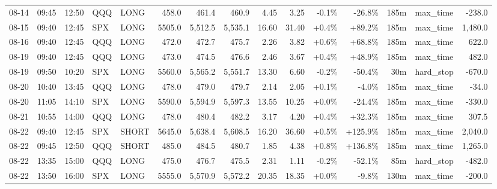 \documentclass[11pt,a4paper,twoside]{article}
\begin{document}
\begin{landscape}
\begin{center}
\begin{longtable}{>{\color{txtmain}}l l l l l r r r r r r r r >{\color{txtmain}}l r}
08-14 & 09:45 & 12:50 & QQQ & LONG & 458.0 & 461.4 & 460.9 & 4.45 & 3.25 & \textcolor{lossred}{-0.1\%} & \textcolor{lossred}{-26.8\%} & 185m & max\_time & \textcolor{lossred}{-238.0} \\
08-15 & 09:40 & 12:45 & SPX & LONG & 5505.0 & 5,512.5 & 5,535.1 & 16.60 & 31.40 & \textcolor{wingreen}{+0.4\%} & \textcolor{wingreen}{+89.2\%} & 185m & max\_time & \textcolor{wingreen}{1,480.0} \\
08-16 & 09:40 & 12:45 & QQQ & LONG & 472.0 & 472.7 & 475.7 & 2.26 & 3.82 & \textcolor{wingreen}{+0.6\%} & \textcolor{wingreen}{+68.8\%} & 185m & max\_time & \textcolor{wingreen}{622.0} \\
08-19 & 09:40 & 12:45 & QQQ & LONG & 473.0 & 474.5 & 476.6 & 2.46 & 3.67 & \textcolor{wingreen}{+0.4\%} & \textcolor{wingreen}{+48.9\%} & 185m & max\_time & \textcolor{wingreen}{482.0} \\
08-19 & 09:50 & 10:20 & SPX & LONG & 5560.0 & 5,565.2 & 5,551.7 & 13.30 & 6.60 & \textcolor{lossred}{-0.2\%} & \textcolor{lossred}{-50.4\%} & 30m & hard\_stop & \textcolor{lossred}{-670.0} \\
08-20 & 10:40 & 13:45 & QQQ & LONG & 478.0 & 479.0 & 479.7 & 2.14 & 2.05 & \textcolor{wingreen}{+0.1\%} & \textcolor{lossred}{-4.0\%} & 185m & max\_time & \textcolor{lossred}{-34.0} \\
08-20 & 11:05 & 14:10 & SPX & LONG & 5590.0 & 5,594.9 & 5,597.3 & 13.55 & 10.25 & \textcolor{wingreen}{+0.0\%} & \textcolor{lossred}{-24.4\%} & 185m & max\_time & \textcolor{lossred}{-330.0} \\
08-21 & 10:55 & 14:00 & QQQ & LONG & 478.0 & 480.4 & 482.2 & 3.17 & 4.20 & \textcolor{wingreen}{+0.4\%} & \textcolor{wingreen}{+32.3\%} & 185m & max\_time & \textcolor{wingreen}{307.5} \\
08-22 & 09:40 & 12:45 & SPX & SHORT & 5645.0 & 5,638.4 & 5,608.5 & 16.20 & 36.60 & \textcolor{wingreen}{+0.5\%} & \textcolor{wingreen}{+125.9\%} & 185m & max\_time & \textcolor{wingreen}{2,040.0} \\
08-22 & 09:45 & 12:50 & QQQ & SHORT & 485.0 & 484.5 & 480.7 & 1.85 & 4.38 & \textcolor{wingreen}{+0.8\%} & \textcolor{wingreen}{+136.8\%} & 185m & max\_time & \textcolor{wingreen}{1,265.0} \\
08-22 & 13:35 & 15:00 & QQQ & LONG & 475.0 & 476.7 & 475.5 & 2.31 & 1.11 & \textcolor{lossred}{-0.2\%} & \textcolor{lossred}{-52.1\%} & 85m & hard\_stop & \textcolor{lossred}{-482.0} \\
08-22 & 13:50 & 16:00 & SPX & LONG & 5555.0 & 5,570.9 & 5,572.2 & 20.35 & 18.35 & \textcolor{wingreen}{+0.0\%} & \textcolor{lossred}{-9.8\%} & 130m & max\_time & \textcolor{lossred}{-200.0} \\

\end{longtable}
\end{center}
\end{landscape}
\end{document}
